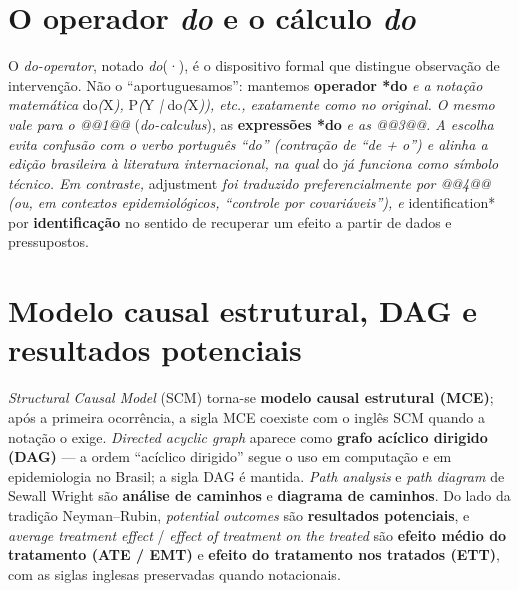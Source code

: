 \documentclass[11pt,a5paper,twoside]{book}
\begin{document}
\section{O operador \textit{do} e o cálculo \textit{do}}
O \textit{do-operator}, notado \textit{do}(·), é o dispositivo formal que distingue observação de intervenção. Não o “aportuguesamos”: mantemos \textbf{operador *do}\textit{ e a notação matemática }do\textit{(}X\textit{), }P\textit{(}Y\textit{ | }do\textit{(}X\textit{)), etc., exatamente como no original. O mesmo vale para o @@1@@} (\textit{do-calculus}), as \textbf{expressões *do}\textit{ e as @@3@@. A escolha evita confusão com o verbo português “do” (contração de “de + o”) e alinha a edição brasileira à literatura internacional, na qual }do\textit{ já funciona como símbolo técnico. Em contraste, }adjustment\textit{ foi traduzido preferencialmente por @@4@@ (ou, em contextos epidemiológicos, “controle por covariáveis”), e }identification* por \textbf{identificação} no sentido de recuperar um efeito a partir de dados e pressupostos.

\section{Modelo causal estrutural, DAG e resultados potenciais}
\textit{Structural Causal Model} (SCM) torna-se \textbf{modelo causal estrutural (MCE)}; após a primeira ocorrência, a sigla MCE coexiste com o inglês SCM quando a notação o exige. \textit{Directed acyclic graph} aparece como \textbf{grafo acíclico dirigido (DAG)} — a ordem “acíclico dirigido” segue o uso em computação e em epidemiologia no Brasil; a sigla DAG é mantida. \textit{Path analysis} e \textit{path diagram} de Sewall Wright são \textbf{análise de caminhos} e \textbf{diagrama de caminhos}. Do lado da tradição Neyman–Rubin, \textit{potential outcomes} são \textbf{resultados potenciais}, e \textit{average treatment effect} / \textit{effect of treatment on the treated} são \textbf{efeito médio do tratamento (ATE / EMT)} e \textbf{efeito do tratamento nos tratados (ETT)}, com as siglas inglesas preservadas quando notacionais.
\end{document}
